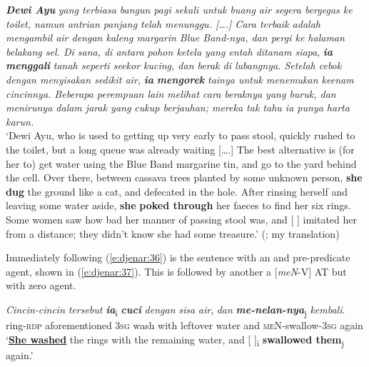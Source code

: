 \documentclass[output=paper
,modfonts
,nonflat]{langsci/langscibook}
\begin{document}
\begin{exe}
	\ex\label{e:djenar:36}
	\textbf{\textit{Dewi Ayu}} \textit{yang terbiasa bangun pagi sekali untuk buang air segera bergegas ke toilet, namun antrian panjang telah menunggu. [….] Cara terbaik adalah mengambil air dengan kaleng margarin Blue Band-nya, dan pergi ke halaman belakang sel. Di sana, di antara pohon ketela yang entah ditanam siapa}, \textbf{\textit{ia}} \textbf{\textit{menggali}} \textit{tanah seperti seekor kucing, dan berak di lubangnya. Setelah cebok dengan menyisakan sedikit air,} \textbf{\textit{ia}} \textbf{\textit{mengorek}} \textit{tainya untuk menemukan keenam cincinnya. Beberapa perempuan lain melihat cara beraknya yang buruk, dan menirunya dalam jarak yang cukup berjauhan; mereka tak tahu ia punya harta karun.}\\
	\glt ‘Dewi Ayu, who is used to getting up very early to pass stool, quickly rushed to the toilet, but a long queue was already waiting [….] The best alternative is (for her to) get water using the Blue Band margarine tin, and go to the yard behind the cell. Over there, between cassava trees planted by some unknown person, \textbf{she} \textbf{dug} the ground like a cat, and defecated in the hole. After rinsing herself and leaving some water aside, \textbf{she} \textbf{poked through} her faeces to find her six rings. Some women saw how bad her manner of passing stool was, and [ ] imitated her from a distance; they didn’t know she had some treasure.’ (\citealt[67]{Kurniawan2002}; my translation)
\end{exe}

\noindent
Immediately following (\ref{e:djenar:36}) is the sentence with an   and pre-predicate agent, shown in (\ref{e:djenar:37}). This  is followed by another a [\textit{meN}-V] AT  but with zero agent. 

\begin{exe}
	\ex\label{e:djenar:37}
	\gll \textit{Cincin-cincin} \textit{tersebut} \textbf{\textit{ia}}\textsubscript{i} \textbf{\textit{cuci}} \textit{dengan} \textit{sisa} \textit{air}, \textit{dan} \textbf{\textit{me-nelan-nya}}\textsubscript{j} \textit{kembali}.\\
	ring-\textsc{rdp} aforementioned 3\textsc{sg} wash with leftover  water  and  \textsc{meN}-swallow-\textsc{3sg} again\\
	\glt ‘\uline{\textbf{She washed}} the rings with the remaining water, and [ ]\textsubscript{i} \textbf{swallowed them}\textsubscript{j} again.’ \hfill \citep[67]{Kurniawan2002}
\end{exe}
\end{document}
